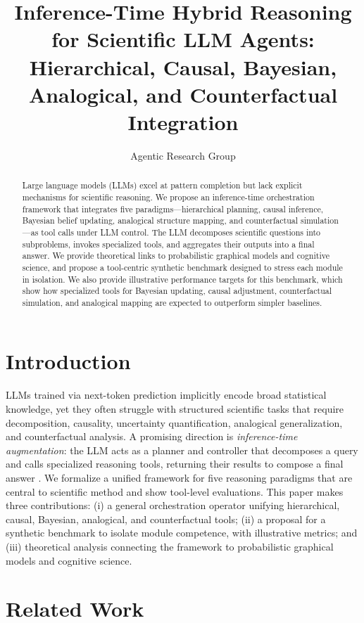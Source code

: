 \documentclass[11pt]{article}
\title{Inference-Time Hybrid Reasoning for Scientific LLM Agents:\\
Hierarchical, Causal, Bayesian, Analogical, and Counterfactual Integration}
\author{Agentic Research Group}
\date{}
\begin{document}
\maketitle

\begin{abstract}
Large language models (LLMs) excel at pattern completion but lack explicit mechanisms for scientific reasoning. We propose an inference-time orchestration framework that integrates five paradigms---hierarchical planning, causal inference, Bayesian belief updating, analogical structure mapping, and counterfactual simulation---as tool calls under LLM control. The LLM decomposes scientific questions into subproblems, invokes specialized tools, and aggregates their outputs into a final answer. We provide theoretical links to probabilistic graphical models and cognitive science, and propose a tool-centric synthetic benchmark designed to stress each module in isolation. We also provide illustrative performance targets for this benchmark, which show how specialized tools for Bayesian updating, causal adjustment, counterfactual simulation, and analogical mapping are expected to outperform simpler baselines.
\end{abstract}

\section{Introduction}
LLMs trained via next-token prediction implicitly encode broad statistical knowledge, yet they often struggle with structured scientific tasks that require decomposition, causality, uncertainty quantification, analogical generalization, and counterfactual analysis. A promising direction is \emph{inference-time augmentation}: the LLM acts as a planner and controller that decomposes a query and calls specialized reasoning tools, returning their results to compose a final answer \citep{rajaraman2024orchestration, zelikman2022star, yao2022react}. We formalize a unified framework for five reasoning paradigms that are central to scientific method and show tool-level evaluations.
This paper makes three contributions: (i) a general orchestration operator unifying hierarchical, causal, Bayesian, analogical, and counterfactual tools; (ii) a proposal for a synthetic benchmark to isolate module competence, with illustrative metrics; and (iii) theoretical analysis connecting the framework to probabilistic graphical models and cognitive science.

\section{Related Work}
\end{document}
